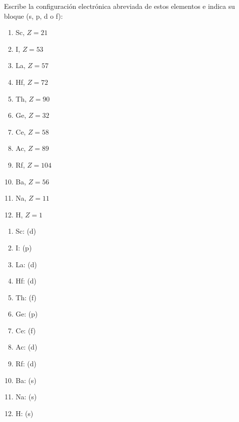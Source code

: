 \begin{exercise}
    Escribe la configuración electrónica abreviada de estos elementos e indica su bloque (s, p, d o f):
    \begin{multicols}{4}
        \begin{enumerate}[label=\alph*)]
            \item Sc, \(Z = 21\)
            \item I, \(Z = 53\)
            \item La, \(Z = 57\)
            \item Hf, \(Z = 72\)
            \item Th, \(Z = 90\)
            \item Ge, \(Z = 32\)
            \item Ce, \(Z = 58\)
            \item Ac, \(Z = 89\)
            \item Rf, \(Z = 104\)
            \item Ba, \(Z = 56\)
            \item Na, \(Z = 11\)
            \item H, \(Z = 1\)
        \end{enumerate}
    \end{multicols}
    \begin{solu}
        \begin{multicols}{2}
            \begin{enumerate}[label=\alph*)]
                \item Sc:  (d)
                \item I:  (p)
                \item La:  (d)
                \item Hf:  (d)
                \item Th:  (f)
                \item Ge:  (p)
                \item Ce:  (f)
                \item Ac:  (d)
                \item Rf:  (d)
                \item Ba:  (s)
                \item Na:  (s)
                \item H:  (s)
            \end{enumerate}
        \end{multicols}
    \end{solu}
\end{exercise}

